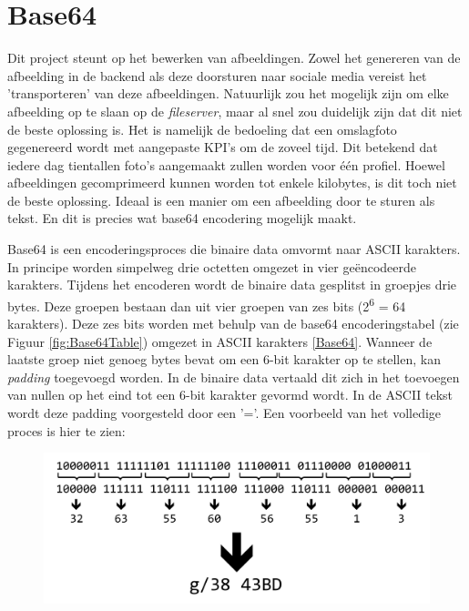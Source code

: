 \newpage
\section{Base64}
Dit project steunt op het bewerken van afbeeldingen. Zowel het genereren van de afbeelding in de backend als deze doorsturen naar sociale media vereist het 'transporteren' van deze afbeeldingen. Natuurlijk zou het mogelijk zijn om elke afbeelding op te slaan op de \textit{fileserver}, maar al snel zou duidelijk zijn dat dit niet de beste oplossing is. Het is namelijk de bedoeling dat een omslagfoto gegenereerd wordt met aangepaste KPI's om de zoveel tijd. Dit betekend dat iedere dag tientallen foto's aangemaakt zullen worden voor \'{e}\'{e}n profiel. Hoewel afbeeldingen gecomprimeerd kunnen worden tot enkele kilobytes, is dit toch niet de beste oplossing. Ideaal is een manier om een afbeelding door te sturen als tekst. En dit is precies wat base64 encodering mogelijk maakt. 

Base64 is een encoderingsproces die binaire data omvormt naar ASCII karakters. %
In principe worden simpelweg drie octetten omgezet in vier ge\"{e}ncodeerde karakters. Tijdens het encoderen wordt de binaire data gesplitst in groepjes drie bytes. Deze groepen bestaan dan uit vier groepen van zes bits (2\textsuperscript{6} = 64 karakters). Deze zes bits worden met behulp van de base64 encoderingstabel (zie Figuur \ref{fig:Base64Table}) omgezet in ASCII karakters \ref{Base64}. Wanneer de laatste groep niet genoeg bytes bevat om een 6-bit karakter op te stellen, kan \textit{padding} toegevoegd worden. In de binaire data vertaald dit zich in het toevoegen van nullen op het eind tot een 6-bit karakter gevormd wordt. In de ASCII tekst wordt deze padding voorgesteld door een '='. Een voorbeeld van het volledige proces is hier te zien: 

\begin{figure}[H]
	\centering
	\includegraphics[width=1\textwidth]{Figuren/Base64Process.png}
	\label{fig:Base64}
\end{figure}

